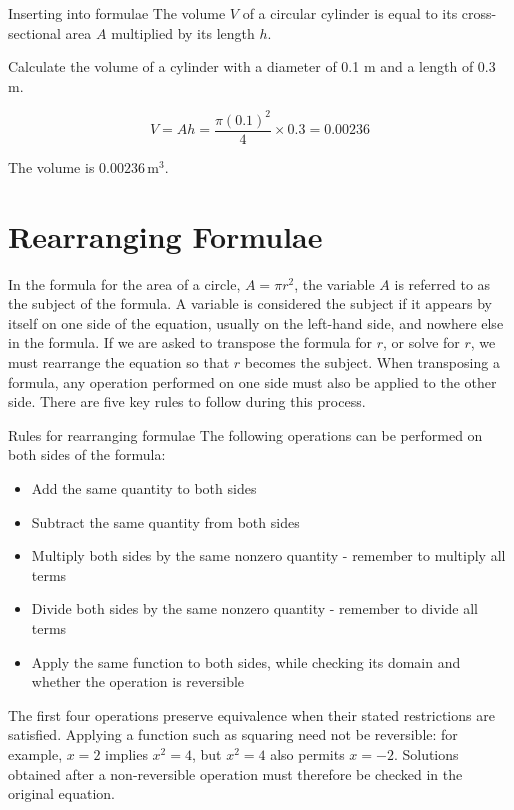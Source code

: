 \begin{example} Inserting into formulae \newline
The volume \(V\) of a circular cylinder is equal to its cross-sectional area \(A\) multiplied by its length \(h\).

Calculate the volume of a cylinder with a diameter of 0.1 m and a length of 0.3 m.

\begin{solution}
  \[
V = Ah = \frac{\pi (0.1)^2}{4} \times 0.3 = 0.00236
\]

The volume is \(0.00236 \, \text{m}^3\).
\end{solution}
\end{example}

\section{Rearranging Formulae}
In the formula for the area of a circle, \(A = \pi r^2\), the variable \(A\) is referred to as the subject of the formula. A variable is considered the subject if it appears by itself on one side of the equation, usually on the left-hand side, and nowhere else in the formula. If we are asked to transpose the formula for \(r\), or solve for \(r\), we must rearrange the equation so that \(r\) becomes the subject. When transposing a formula, any operation performed on one side must also be applied to the other side. There are five key rules to follow during this process.

\begin{custombox}{Rules for rearranging formulae}
The following operations can be performed on both sides of the formula:
\begin{itemize}
    \item Add the same quantity to both sides
    \item Subtract the same quantity from both sides
    \item Multiply both sides by the same nonzero quantity - remember to multiply all terms
    \item Divide both sides by the same nonzero quantity - remember to divide all terms
    \item Apply the same function to both sides, while checking its domain and whether the operation is reversible
\end{itemize}
\end{custombox}

The first four operations preserve equivalence when their stated restrictions are satisfied. Applying a function such as squaring need not be reversible: for example, \(x=2\) implies \(x^2=4\), but \(x^2=4\) also permits \(x=-2\). Solutions obtained after a non-reversible operation must therefore be checked in the original equation.

